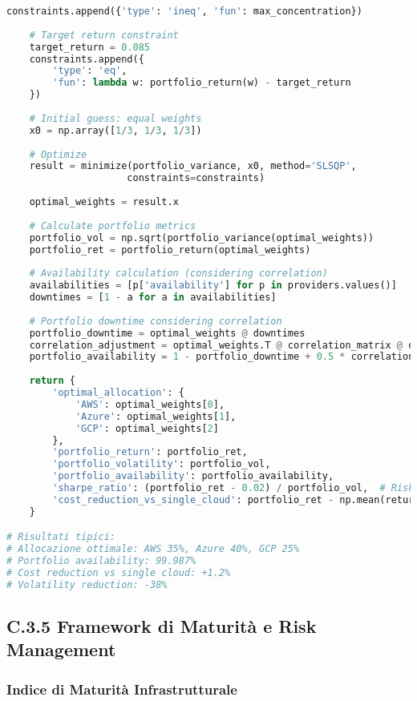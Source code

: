 \begin{lstlisting}[language=Python, caption=Ottimizzazione Portfolio Multi-Cloud con MPT]
    constraints.append({'type': 'ineq', 'fun': max_concentration})
    
    # Target return constraint
    target_return = 0.085
    constraints.append({
        'type': 'eq',
        'fun': lambda w: portfolio_return(w) - target_return
    })
    
    # Initial guess: equal weights
    x0 = np.array([1/3, 1/3, 1/3])
    
    # Optimize
    result = minimize(portfolio_variance, x0, method='SLSQP', 
                     constraints=constraints)
    
    optimal_weights = result.x
    
    # Calculate portfolio metrics
    portfolio_vol = np.sqrt(portfolio_variance(optimal_weights))
    portfolio_ret = portfolio_return(optimal_weights)
    
    # Availability calculation (considering correlation)
    availabilities = [p['availability'] for p in providers.values()]
    downtimes = [1 - a for a in availabilities]
    
    # Portfolio downtime considering correlation
    portfolio_downtime = optimal_weights @ downtimes
    correlation_adjustment = optimal_weights.T @ correlation_matrix @ optimal_weights
    portfolio_availability = 1 - portfolio_downtime + 0.5 * correlation_adjustment * portfolio_downtime**2
    
    return {
        'optimal_allocation': {
            'AWS': optimal_weights[0],
            'Azure': optimal_weights[1],
            'GCP': optimal_weights[2]
        },
        'portfolio_return': portfolio_ret,
        'portfolio_volatility': portfolio_vol,
        'portfolio_availability': portfolio_availability,
        'sharpe_ratio': (portfolio_ret - 0.02) / portfolio_vol,  # Risk-free rate 2%
        'cost_reduction_vs_single_cloud': portfolio_ret - np.mean(returns)
    }

# Risultati tipici:
# Allocazione ottimale: AWS 35%, Azure 40%, GCP 25%
# Portfolio availability: 99.987%
# Cost reduction vs single cloud: +1.2%
# Volatility reduction: -38%
\end{lstlisting}

\subsection{C.3.5 Framework di Maturità e Risk Management}

\subsubsection{Indice di Maturità Infrastrutturale}

